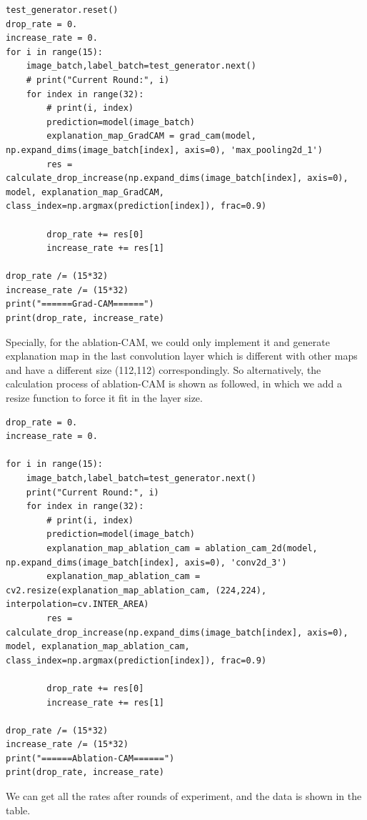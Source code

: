 \documentclass[conference]{IEEEtran}
\begin{document}
\begin{lstlisting}
test_generator.reset()
drop_rate = 0.
increase_rate = 0.
for i in range(15):
    image_batch,label_batch=test_generator.next()
    # print("Current Round:", i)
    for index in range(32):
        # print(i, index)
        prediction=model(image_batch)
        explanation_map_GradCAM = grad_cam(model, np.expand_dims(image_batch[index], axis=0), 'max_pooling2d_1')
        res = calculate_drop_increase(np.expand_dims(image_batch[index], axis=0), model, explanation_map_GradCAM, class_index=np.argmax(prediction[index]), frac=0.9)

        drop_rate += res[0]
        increase_rate += res[1]

drop_rate /= (15*32)
increase_rate /= (15*32)
print("======Grad-CAM======")
print(drop_rate, increase_rate)
\end{lstlisting}

Specially, for the ablation-CAM, we could only implement it and generate explanation map in the last convolution layer which is different with other maps and have a different size (112,112) correspondingly. So alternatively, the calculation process of ablation-CAM is shown as followed, in which we add a resize function to force it fit in the layer size.

\begin{lstlisting}
drop_rate = 0.
increase_rate = 0.

for i in range(15):
    image_batch,label_batch=test_generator.next()
    print("Current Round:", i)
    for index in range(32):
        # print(i, index)
        prediction=model(image_batch)
        explanation_map_ablation_cam = ablation_cam_2d(model, np.expand_dims(image_batch[index], axis=0), 'conv2d_3')
        explanation_map_ablation_cam = cv2.resize(explanation_map_ablation_cam, (224,224), interpolation=cv.INTER_AREA)
        res = calculate_drop_increase(np.expand_dims(image_batch[index], axis=0), model, explanation_map_ablation_cam, class_index=np.argmax(prediction[index]), frac=0.9)

        drop_rate += res[0]
        increase_rate += res[1]

drop_rate /= (15*32)
increase_rate /= (15*32)
print("======Ablation-CAM======")
print(drop_rate, increase_rate)
\end{lstlisting}

We can get all the rates after rounds of experiment, and the data is shown in the table.
\end{document}
